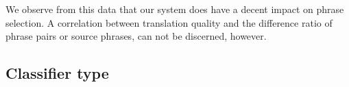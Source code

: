 \begin{table} 
\noindent{}
\caption{The number of phrases in the context-informed test output that are not
in the non-context-informed baseline.} 
\label{tab:decodediff}
\end{table}

We observe from this data that our system does have a decent impact on phrase
selection. A correlation between translation quality and the difference ratio
of phrase pairs or source phrases, can not be discerned, however.

\subsection{Classifier type}
\label{sec:typeopt}

